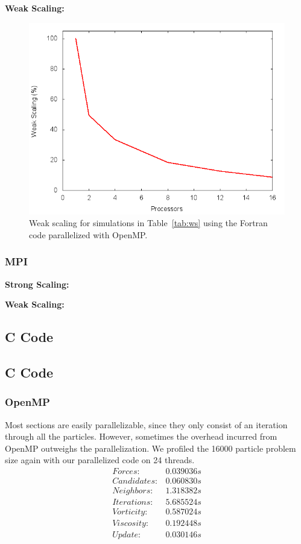 \documentclass{scrartcl}
\begin{document}
  
  \textbf{Weak Scaling:}  
    \begin{figure}
    	\begin{center}
    		\includegraphics[width=0.7\columnwidth]{./fort_scaling/ws.png}
    		\caption{Weak scaling for simulations in Table~\ref{tab:ws} using the Fortran code parallelized with OpenMP.}
    		\label{fig:ws_fort_omp}
    	\end{center}
    \end{figure}
  
  \subsubsection{MPI}
  \textbf{Strong Scaling:}
  
  \textbf{Weak Scaling:}
  
    \subsection{C Code}  
    \subsection{C Code}  
    \subsubsection{OpenMP}
    
    Most sections are easily parallelizable, since they only consist of an iteration through all the particles. However, sometimes the overhead incurred from OpenMP outweighs the parallelization. We profiled the 16000 particle problem size again with our parallelized code on 24 threads.
    \[\begin{array}{lc}
    Forces:     & 0.039036 s \\
    Candidates: & 0.060830 s \\
    Neighbors:  & 1.318382 s \\
    Iterations: & 5.685524 s \\
    Vorticity:  & 0.587024 s \\
    Viscosity:  & 0.192448 s \\
    Update:     & 0.030146 s \\
    \end{array}\]
    
\end{document}
